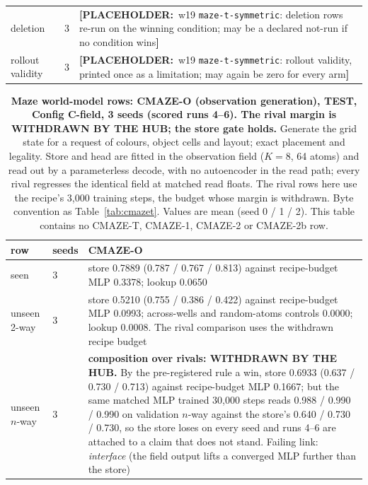 \documentclass{article} %
\newcommand{\PLACEHOLDER}[1]{{\color{red}\textbf{[PLACEHOLDER:}~#1\textbf{]}}}
\begin{document}
\begin{table}[h]
\begin{adjustbox}{max width=\linewidth}
\begin{tabular}{p{1.9cm}p{1.2cm}p{10.0cm}}
deletion & 3 & \PLACEHOLDER{w19 \texttt{maze-t-symmetric}: deletion rows re-run on the winning condition; may be a declared not-run if no condition wins} \\
rollout validity & 3 & \PLACEHOLDER{w19 \texttt{maze-t-symmetric}: rollout validity, printed once as a limitation; may again be zero for every arm} \\
\bottomrule
\end{tabular}\end{adjustbox}
\end{table}


\begin{table}[h]
\centering\scriptsize
\caption{\textbf{Maze world-model rows: CMAZE-O (observation generation), TEST, Config C-field, 3 %
seeds (scored runs 4--6). The rival margin is WITHDRAWN BY THE HUB; the store gate holds.} Generate
the grid state for a request of colours, object cells and layout; exact placement and legality.
Store and head are fitted in the observation field ($K=8$, 64 atoms) and read out by a parameterless %
decode, with no autoencoder in the read path; every rival regresses the identical field at matched
read floats. The rival rows here use the recipe's 3,000 training steps, the budget whose margin is %
withdrawn. Byte convention as Table~\ref{tab:cmazet}. Values are mean (seed 0 / 1 / 2). This table
contains no CMAZE-T, CMAZE-1, CMAZE-2 or CMAZE-2b row.}
\label{tab:cmazeo}
\setlength{\tabcolsep}{2pt}
\begin{adjustbox}{max width=\linewidth}\begin{tabular}{p{1.9cm}p{1.2cm}p{10.0cm}}
\toprule
row & seeds & CMAZE-O \\
\midrule
seen & 3 & store 0.7889 (0.787 / 0.767 / 0.813) against recipe-budget MLP 0.3378; lookup 0.0650 \\
unseen 2-way & 3 & store 0.5210 (0.755 / 0.386 / 0.422) against recipe-budget MLP 0.0993; across-wells and random-atoms controls 0.0000; lookup 0.0008. The rival comparison uses the withdrawn recipe budget \\
unseen $n$-way & 3 & \textbf{composition over rivals: WITHDRAWN BY THE HUB.} By the pre-registered rule a win, store 0.6933 (0.637 / 0.730 / 0.713) against recipe-budget MLP 0.1667; but the same matched MLP trained 30,000 steps reads 0.988 / 0.990 / 0.990 on validation $n$-way against the store's 0.640 / 0.730 / 0.730, so the store loses on every seed and runs 4--6 are attached to a claim that does not stand. Failing link: \emph{interface} (the field output lifts a converged MLP further than the store) \\

\end{tabular}
\end{adjustbox}
\end{table}
\end{document}
